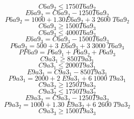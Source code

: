 \begin{equation}
C6a9_{2} \leq 1750 T6a9_{2}
\end{equation}
\begin{equation}
E6a9_{2} = C6a9_{2} - 1250 T6a9_{2}
\end{equation}
\begin{equation}
P6a9_{2} = 1000 + 1.30 E6a9_{2} + 3 \; 2600  \;T6a9_{2}
\end{equation}
\begin{equation}
C6a9_{3} \geq 1500 T6a9_{3}
\end{equation}
\begin{equation}
C6a9_{3} \leq 4000 T6a9_{3}
\end{equation}
\begin{equation}
E6a9_{3} = C6a9_{3} - 1500 T6a9_{3}
\end{equation}
\begin{equation}
P6a9_{3} = 500+ 3 \; E6a9_{3} + 3 \; 3000 \; T6a9_{3}
\end{equation}
\begin{equation}
PF6a9 = P6a9_{1} + P6a9_{2} + P6a9_{3}
\end{equation}
\begin{equation}
C9a3_{1} \geq 850 T9a3_{1}
\end{equation}
\begin{equation}
C9a3_{1} \leq 2000 T9a3_{1}
\end{equation}
\begin{equation}
E9a3_{1} = C9a3_{1} - 850 T9a3_{1}
\end{equation}
\begin{equation}
P9a3_{1} = 2000 + 2 \; E9a3_{1} + 6 \; 1000 \; T9a3_{1}
\end{equation}
\begin{equation}
C9a3_{2} \geq 1250 T9a3_{2}
\end{equation}
\begin{equation}
C9a3_{2} \leq 1750 T9a3_{2}
\end{equation}
\begin{equation}
E9a3_{2} = C9a3_{2} - 1250 T9a3_{2}
\end{equation}
\begin{equation}
P9a3_{2} = 1000 + 1.30 \; E9a3_{2} + 6 \; 2600 \; T9a3_{2}
\end{equation}
\begin{equation}
C9a3_{3} \geq 1500 T9a3_{3}
\end{equation}
